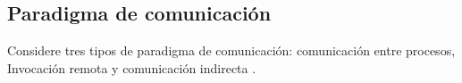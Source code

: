 \begin{description}
	
	
\end{description}

\subsection{Paradigma de comunicación }
\label{subsec:paradigmas} 

Considere tres tipos de paradigma de comunicación: comunicación entre procesos, Invocación remota y comunicación indirecta \cite{Steen2017} \cite{Elshebani2009} \cite{Silcock1995}  .

